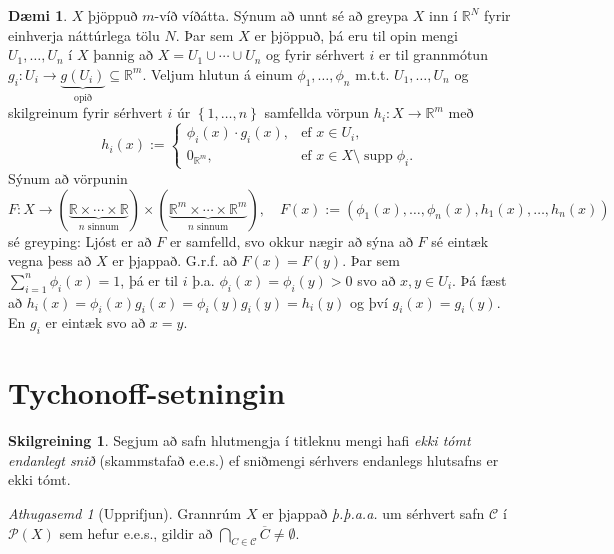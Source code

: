\documentclass[a4paper,icelandic]{book}
\theoremstyle{definition}
\newtheorem{skilgr}{Skilgreining}[section]
\newtheorem{daemi}{Dæmi}[section]
\theoremstyle{plain}
\theoremstyle{remark}
\newtheorem*{ath}{Athugasemd}
\newcommand{\R}{\mathbb{R}} %
\DeclareMathOperator{\supp}{supp} %
\begin{document}
\begin{daemi}
  $X$ þjöppuð $m$-víð víðátta. Sýnum að unnt sé að greypa $X$ inn í
  $\R^N$ fyrir einhverja náttúrlega tölu $N$. Þar sem $X$ er þjöppuð, þá
  eru til opin mengi $U_1,\dots,U_n$ í $X$ þannig að $X =
  U_1\cup\cdots\cup U_n$ og fyrir sérhvert $i$ er til grannmótun
  $g_i:U_i\to\underbrace{g(U_i)}_{\text{opið}}\subseteq \R^m$. Veljum
  hlutun á einum $\phi_1,\dots,\phi_n$ m.t.t. $U_1,\dots,U_n$ og
  skilgreinum fyrir sérhvert $i$ úr $\left\{ 1,\dots,n \right\}$
  samfellda vörpun $h_i: X\to\R^m$ með \[
  h_i(x) := \begin{cases}
    \phi_i(x)\cdot g_i(x),&\text{ef }x\in U_i,\\
    0_{\R^m},             &\text{ef }x\in X\setminus\supp\phi_i.
  \end{cases}
  \]
  Sýnum að vörpunin \[
  F: X\to (\underbrace{\R\times\cdots\times\R}_{n\text{ sinnum}}) \times
  (\underbrace{\R^m\times\cdots\times\R^m}_{n\text{ sinnum}}),
  \quad
  F(x) := (\phi_1(x),\dots,\phi_n(x), h_1(x),\dots,h_n(x))
  \]
  sé greyping: Ljóst er að $F$ er samfelld, svo okkur nægir að sýna að
  $F$ sé eintæk vegna þess að $X$ er þjappað. G.r.f. að $F(x) = F(y)$.
  Þar sem $\sum_{i=1}^{n}\phi_i (x) = 1$, þá er til $i$ þ.a.
  $\phi_i(x)=\phi_i(y)>0$ svo að $x,y\in U_i$. Þá fæst að $h_i(x) =
  \phi_i(x)g_i(x) = \phi_i(y)g_i(y) = h_i(y)$ og því $g_i(x)=g_i(y)$. En
  $g_i$ er eintæk svo að $x=y$.
\end{daemi}


\section{Tychonoff-setningin}

\begin{skilgr}
  Segjum að safn hlutmengja í titleknu mengi hafi \emph{ekki tómt
  endanlegt snið}
  (skammstafað e.e.s.) ef sniðmengi sérhvers endanlegs hlutsafns er ekki
  tómt.
\end{skilgr}

\begin{ath}
  [Upprifjun] 
  Grannrúm $X$ er þjappað \emph{þ.þ.a.a.} um sérhvert safn
  $\mathcal C$ í $\mathcal P(X)$ sem hefur e.e.s., gildir að
  $\bigcap_{C\in\mathcal C}\overline C \neq \emptyset$.
\end{ath}
\end{document}
